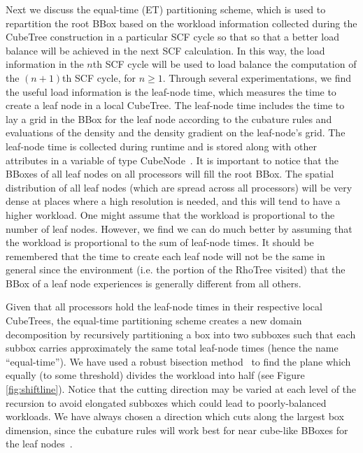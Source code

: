 \documentclass[preprint]{revtex4}
\begin{document}
Next we discuss the equal-time (ET) partitioning scheme, which is used
to repartition the root BBox based on the workload
information collected during the CubeTree construction in a particular
SCF cycle so that so that a better load balance will be achieved in
the next SCF calculation. In this way, the load information in the
$n$th SCF cycle will be used to load balance the computation of the
$(n+1)$th SCF cycle, for $n \ge 1$.  Through several experimentations,
we find the useful load information is the leaf-node time, which
measures the time to create a leaf node in a local CubeTree. The leaf-node
time includes the time to lay a grid in the BBox for the leaf node according to the 
cubature rules and evaluations of the density
and the density gradient on the leaf-node's grid. The
leaf-node time is collected during runtime and is stored along with
other attributes in a variable of type
CubeNode~\cite{Challacombe_00v113}.  It is important to notice that
the BBoxes of all leaf nodes on all processors will fill the root
BBox. The spatial distribution of all leaf nodes (which are spread
across all processors) will be very dense at places where a high resolution is
needed, and this will tend to have a higher workload. One might assume
that the workload is proportional to the number of leaf
nodes. However, we find we can do much better by assuming that the
workload is proportional to the sum of leaf-node times.
It should be remembered that the time
to create each leaf node will not be the same in general since the
environment (i.e. the portion of the RhoTree visited) that the BBox of a leaf
node experiences is generally different from all others.

Given that all processors hold the leaf-node times in their
respective local CubeTrees, the equal-time partitioning scheme creates
a new domain decomposition by recursively partitioning a box into two
subboxes such that each subbox carries approximately the same total
leaf-node times (hence the name ``equal-time'').  We have used a
robust bisection method~\cite{WPress92} to find the plane which
equally (to some threshold) divides the workload into half (see Figure
\ref{fig:shiftline}). Notice that the cutting direction may be varied
at each level of the recursion to avoid elongated subboxes which could
lead to poorly-balanced workloads. We have always chosen a direction
which cuts along the largest box dimension, since the cubature rules
will work best for near cube-like BBoxes for the leaf
nodes~\cite{Stroud71}.
\end{document}
